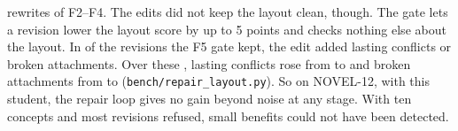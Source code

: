 rewrites of F2--F4. The edits did not keep the layout clean, though. The gate lets a revision lower the layout
score by up to 5 points and checks nothing else about the layout. In \RLWorse{} of the \RLRevisions{} revisions the F5 gate kept, the
edit added lasting conflicts or broken attachments. Over these \RLRevisions{}, lasting conflicts rose from
\RLConflictsBase{} to \RLConflictsLearner{} and broken attachments from \RLAttachBase{} to \RLAttachLearner{}
(\texttt{bench/repair\_layout.py}). So on NOVEL-12, with this student, the repair loop gives no gain
beyond noise at any stage. With ten concepts and most revisions refused, small benefits could not have been detected.


